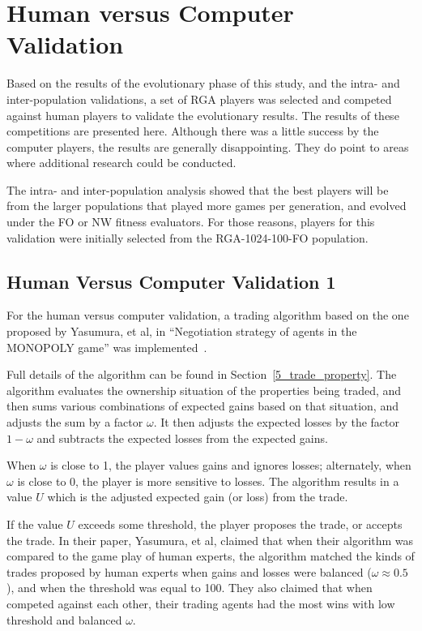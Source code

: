 \section{Human versus Computer Validation}\label{6_humanValidation}

Based on the results of the evolutionary phase of this study, and the intra- and
inter-population validations, a set of RGA players was selected and competed
against human players to validate the evolutionary results. The results of these
competitions are presented here. Although there was a little success by the
computer players, the results are generally disappointing. They do point to
areas where additional research could be conducted.

The intra- and inter-population analysis showed that the best players will be
from the larger populations that played more games per generation, and evolved
under the FO or NW fitness evaluators. For those reasons, players for this
validation were initially selected from the RGA-1024-100-FO population.

\subsection{Human Versus Computer Validation 1}\label{6_humanVRGA1}

For the human versus computer validation, a trading algorithm based on the one
proposed by Yasumura, et al, in ``Negotiation strategy of agents in the MONOPOLY
game'' was implemented~\cite{Yasumura2001Negotiate}.

Full details of the algorithm can be found in Section~\ref{5_trade_property}.
The algorithm evaluates the ownership situation of the properties being traded,
and then sums various combinations of expected gains based on that situation,
and adjusts the sum by a factor \(\omega\). It then adjusts the expected losses
by the factor \(1-\omega\) and subtracts the expected losses from the expected
gains.

When \(\omega\) is close to 1, the player values gains and ignores losses;
alternately, when \(\omega\) is close to 0, the player is more sensitive to
losses. The algorithm results in a value \(U\) which is the adjusted expected
gain (or loss) from the trade.

If the value \(U\) exceeds some threshold, the player proposes the trade, or
accepts the trade. In their paper, Yasumura, et al, claimed that when their
algorithm was compared to the game play of human experts, the algorithm matched
the kinds of trades proposed by human experts when gains and losses were
balanced (\(\omega \approx 0.5\)), and when the threshold was equal to 100. They
also claimed that when competed against each other, their trading agents had the
most wins with low threshold and balanced \(\omega\).

